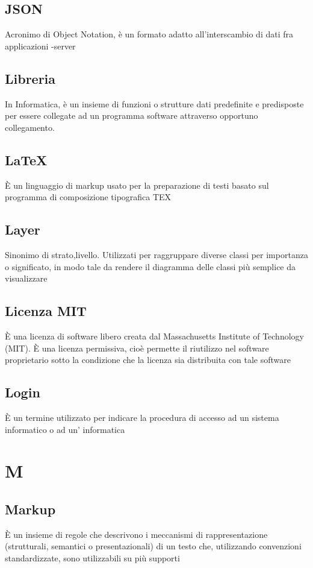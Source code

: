 {{		\subsection{JSON}
		Acronimo di  Object Notation, è un formato adatto all'interscambio di dati fra applicazioni -server


		\subsection{Libreria}
		In Informatica, è un insieme di funzioni o strutture dati predefinite e predisposte per essere collegate ad un programma software attraverso opportuno collegamento. 


		\subsection{LaTeX}
		È un linguaggio di markup usato per la preparazione di testi basato sul programma di composizione tipografica TEX


		\subsection{Layer}
		Sinonimo di strato,livello. Utilizzati per raggruppare diverse classi per importanza o significato, in modo tale da rendere il diagramma delle classi più semplice da visualizzare


		\subsection{Licenza MIT}
		È una licenza di software libero creata dal Massachusetts Institute of Technology (MIT). È una licenza permissiva, cioè permette il riutilizzo nel software proprietario sotto la condizione che la licenza sia distribuita con tale software


		\subsection{Login}
		È un termine utilizzato per indicare la procedura di accesso ad un sistema informatico o ad un' informatica


\section{M}
		\subsection{Markup}
		È un insieme di regole che descrivono i meccanismi di rappresentazione (strutturali, semantici o presentazionali) di un testo che, utilizzando convenzioni standardizzate, sono utilizzabili su più supporti


}}
